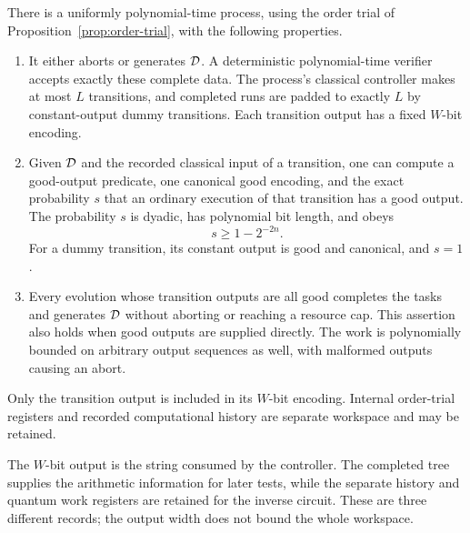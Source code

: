 \begin{proposition}
\label{prop:process}
There is a uniformly polynomial-time process, using the order trial of
Proposition~\ref{prop:order-trial}, with the following properties.
\begin{enumerate}
\item It either aborts or generates $\mathcal D$.  A deterministic polynomial-time
verifier accepts exactly these complete data.  The process's classical controller
makes at most $L$ transitions, and completed runs are padded to exactly $L$
by constant-output dummy transitions.  Each transition output has a fixed
$W$-bit encoding.
\item Given $\mathcal D$ and the recorded classical input of a transition, one can
compute a good-output predicate, one canonical good encoding, and the exact
probability $s$ that an ordinary execution of that transition has a good
output.  The probability $s$ is dyadic, has polynomial bit length, and obeys
\[
 s\ge1-2^{-2n}.
\]
For a dummy transition, its constant output is good and canonical, and
$s=1$.
\item Every evolution whose transition outputs are all good completes the
tasks and generates $\mathcal D$ without aborting or reaching a resource cap.  This
assertion also holds when good outputs are supplied directly.  The work is
polynomially bounded on arbitrary output sequences as well, with malformed
outputs causing an abort.
\end{enumerate}
Only the transition output is included in its $W$-bit encoding.  Internal
order-trial registers and recorded computational history are separate
workspace and may be retained.
\end{proposition}

The $W$-bit output is the string consumed by the controller. The completed
tree supplies the arithmetic information for later tests, while the
separate history and quantum work registers are retained for the inverse
circuit. These are three different records; the output width does not
bound the whole workspace.

